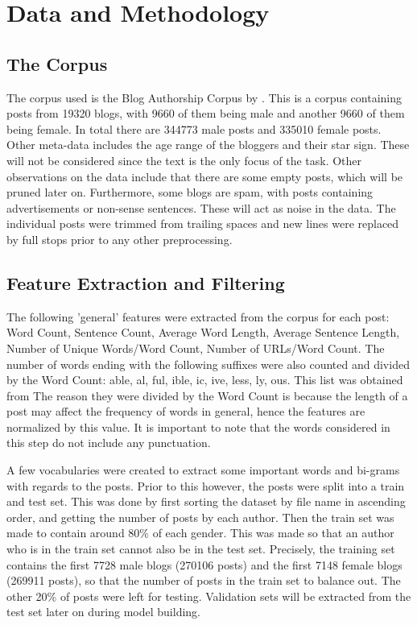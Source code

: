 \section{Data and Methodology}

\subsection{The Corpus}
The corpus used is the Blog Authorship Corpus by \cite{2}. This is a corpus containing posts from 19320 blogs, with 9660 of them being male and another 9660 of them being female. In total there are 344773 male posts and 335010 female posts. Other meta-data includes the age range of the bloggers and their star sign. These will not be considered since the text is the only focus of the task. Other observations on the data include that there are some empty posts, which will be pruned later on. Furthermore, some blogs are spam, with posts containing advertisements or non-sense sentences. These will act as noise in the data. The individual posts were trimmed from trailing spaces and new lines were replaced by full stops prior to any other preprocessing.


\subsection{Feature Extraction and Filtering}
The following 'general' features were extracted from the corpus for each post: Word Count, Sentence Count, Average Word Length, Average Sentence Length, Number of Unique Words/Word Count, Number of URLs/Word Count. The number of words ending with the following suffixes were also counted and divided by the Word Count: able, al, ful, ible, ic, ive, less, ly, ous. This list was obtained from \cite{4} The reason they were divided by the Word Count is because the length of a post may affect the frequency of words in general, hence the features are normalized by this value. It is important to note that the words considered in this step do not include any punctuation.

A few vocabularies were created to extract some important words and bi-grams with regards to the posts. Prior to this however, the posts were split into a train and test set. This was done by first sorting the dataset by file name in ascending order, and getting the number of posts by each author. Then the train set was made to contain around 80\% of each gender. This was made so that an author who is in the train set cannot also be in the test set. Precisely, the training set contains the first 7728 male blogs (270106 posts) and the first 7148 female blogs (269911 posts), so that the number of posts in the train set to balance out. The other 20\% of posts were left for testing. Validation sets will be extracted from the test set later on during model building.

